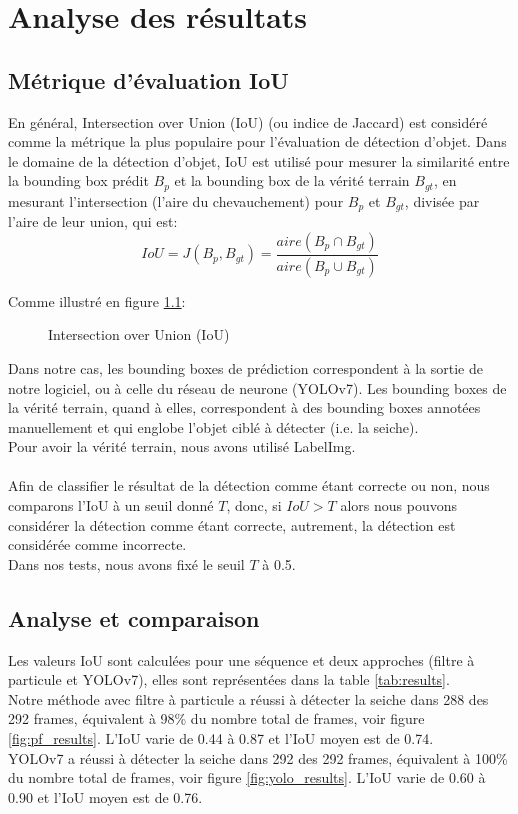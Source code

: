 \chapter{Analyse des résultats}

\section{Métrique d'évaluation IoU}
En général, Intersection over Union (IoU) (ou indice de Jaccard) est considéré comme la métrique la plus populaire pour l'évaluation de détection d'objet. Dans le domaine de la détection d'objet, IoU est utilisé pour mesurer la similarité entre la bounding box prédit $B_{p}$ et la bounding box de la vérité terrain $B_{gt}$, en mesurant l'intersection (l'aire du chevauchement) pour $B_{p}$ et $B_{gt}$, divisée par l'aire de leur union, qui est:
$$IoU=J(B_{p}, B_{gt})=\frac{aire(B_{p} \cap B_{gt})}{aire(B_{p} \cup B_{gt})}$$
 
Comme illustré en figure \ref{fig:iou_example}:

\begin{figure}[!htbp]
\center
\caption{Intersection over Union (IoU)}
\label{fig:iou_example}
\end{figure}
\FloatBarrier

Dans notre cas, les bounding boxes de prédiction correspondent à la sortie de notre logiciel, ou à celle du réseau de neurone (YOLOv7). Les bounding boxes de la vérité terrain, quand à elles, correspondent à des bounding boxes annotées manuellement et qui englobe l'objet ciblé à détecter (i.e. la seiche).\\
Pour avoir la vérité terrain, nous avons utilisé LabelImg.\\
\\
Afin de classifier le résultat de la détection comme étant correcte ou non, nous comparons l'IoU à un seuil donné $T$, donc, si $IoU > T$ alors nous pouvons considérer la détection comme étant correcte, autrement, la détection est considérée comme incorrecte.\\
Dans nos tests, nous avons fixé le seuil $T$ à 0.5.



\clearpage
\section{Analyse et comparaison}
Les valeurs IoU sont calculées pour une séquence et deux approches (filtre à particule et YOLOv7), elles sont représentées dans la table \ref{tab:results}.\\
Notre méthode avec filtre à particule a réussi à détecter la seiche dans 288 des 292 frames, équivalent à 98\% du nombre total de frames, voir figure \ref{fig:pf_results}. L'IoU varie de 0.44 à 0.87 et l'IoU moyen est de 0.74.\\
YOLOv7 a réussi à détecter la seiche dans 292 des 292 frames, équivalent à 100\% du nombre total de frames, voir figure \ref{fig:yolo_results}. L'IoU varie de 0.60 à 0.90 et l'IoU moyen est de 0.76.

